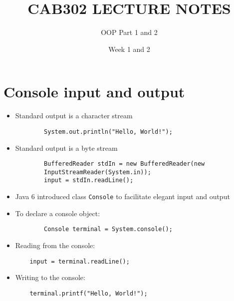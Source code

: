\documentclass{article}
\title{CAB302 LECTURE NOTES}
\author{OOP Part 1 and 2 }
\date{Week 1 and 2}
\begin{document}
\maketitle
\section{Console input and output}
\begin{itemize}
    \item Standard output is a character stream
    \begin{lstlisting}
        System.out.println("Hello, World!");
    \end{lstlisting}
    
    \item Standard output is a byte stream
    \begin{lstlisting}
        BufferedReader stdIn = new BufferedReader(new
        InputStreamReader(System.in));
        input = stdIn.readLine();
    \end{lstlisting}
    
    \item Java 6 introduced class \texttt{Console} to facilitate elegant input and output 
    
    \item To declare a console object:
    \begin{lstlisting}
        Console terminal = System.console();
    \end{lstlisting}
    
    \item Reading from the console:
    \begin{lstlisting}
    input = terminal.readLine();
    \end{lstlisting}
    
    \item Writing to the console:
    \begin{lstlisting}
    terminal.printf("Hello, World!");
    \end{lstlisting}
    
\end{itemize}
\end{document}
